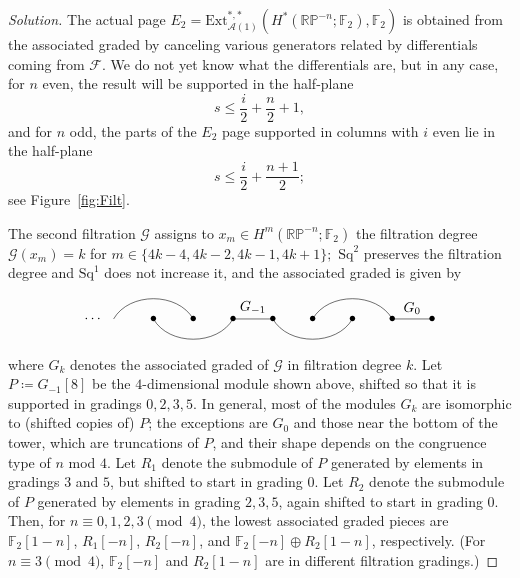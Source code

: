\documentclass{amsart}
\def\RP{\mathbb{RP}}
\def\Filt{\mathcal{F}}
\def\Gilt{\mathcal{G}}
\newcommand{\Ext}{\mathrm{Ext}}
\newcommand{\Steenrod}{\mathcal{A}}
\newcommand{\Aone}{\Steenrod(1)}
\newcommand{\FF}{\mathbb{F}}
\newcommand{\Sq}{\mathrm{Sq}}
\newcommand{\defeq}{\coloneqq}
\begin{document}
\begin{proof}[Solution]
The actual page
$E_2 = \Ext_{\Aone}^{*, *}(H^*(\RP^{-n}; \FF_2), \FF_2)$ is obtained
from the associated graded by canceling various generators related by
differentials coming from $\Filt$. We do not yet know what the
differentials are, but in any case, for $n$ even, the result will be
supported in the half-plane
\begin{equation}\label{eq:even-support}
  s\leq\frac{i}{2}+ \frac{n}{2} + 1,
\end{equation}
and
for $n$ odd, the parts of the $E_2$ page supported in columns with $i$
even lie in the half-plane
\begin{equation}\label{eq:odd-support}
  s \leq \frac{i}{2} + \frac{n+1}{2};
\end{equation}
see
Figure~\ref{fig:Filt}.


The second filtration $\Gilt$ assigns to $x_m \in H^m(\RP^{-n}; \FF_2)$ the filtration degree $\Gilt(x_m) = k$  for  $m \in\{  4k-4, 4k-2, 4k-1, 4k+1\};$
$\Sq^2$ preserves the filtration degree and $\Sq^1$ does not increase it,
and the associated graded is given by
\begin{equation}
\vcenter{\hbox{\begin{tikzpicture}[xscale=-1]
    \foreach\i in {1,...,8}{
      \node at (\i,0) {$\bullet$};
    }
    \foreach \i in {0,2}{
      \draw (2*\i+1,0) -- (2*\i+2,0);
    }
    \foreach \i/\r in {2/1,3/-1,6/-1,7/1}{
      \draw (\i,0) to[out=\r*60,in=\r*120] (\i+2,0);
    }
    \node at (9.5,0) {$\cdots$};
    \node[anchor=south] at (1.5,0) {$G_0$};
    \node[anchor=south] at (5.5,0) {$G_{-1}$};
    
  \end{tikzpicture}}}
\end{equation}
where $G_k$ denotes the associated graded of $\Gilt$ in filtration
degree $k$. Let $P\defeq G_{-1}[8]$ be the $4$-dimensional module
shown above, shifted so that it is supported in gradings $0,2,3,5$. In
general, most of the modules $G_k$ are isomorphic to (shifted copies
of) $P$; the exceptions are $G_0$ and those near the bottom of the
tower, which are truncations of $P$, and their shape depends on the
congruence type of $n$ mod $4$. Let $R_1$ denote the submodule of $P$
generated by elements in gradings $3$ and $5$, but shifted to start in
grading $0$. Let $R_2$ denote the submodule of $P$ generated by
elements in grading $2,3,5$, again shifted to start in grading
$0$. Then, for $n\equiv 0,1,2,3\!\!\pmod 4$, the lowest associated
graded pieces are $\FF_2[1-n]$, $R_1[-n]$, $R_2[-n]$, and
$\FF_2[-n]\oplus R_2[1-n]$, respectively. (For $n\equiv 3\!\!\pmod 4$,
$\FF_2[-n]$ and $R_2[1-n]$ are in different filtration gradings.)



\end{proof}
\end{document}
